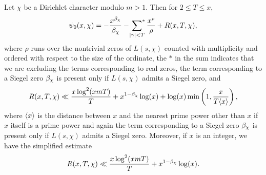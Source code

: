     \begin{corollary}\label{cor:explicit_formula_Dirichlet_corollary}
      Let $\chi$ be a Dirichlet character modulo $m > 1$. Then for $2 \le T \le x$,
      \[
        \psi_{0}(x,\chi) = -\frac{x^{\beta_{\chi}}}{\beta_{\chi}}-\sideset{}{^{\ast}}\sum_{|\gamma| < T}\frac{x^{\rho}}{\rho}+R(x,T,\chi),
      \]
      where $\rho$ runs over the nontrivial zeros of $L(s,\chi)$ counted with multiplicity and ordered with respect to the size of the ordinate, the $\ast$ in the sum indicates that we are excluding the terms corresponding to real zeros, the term corresponding to a Siegel zero $\beta_{\chi}$ is present only if $L(s,\chi)$ admits a Siegel zero, and
      \[
        R(x,T,\chi) \ll \frac{x\log^{2}(xmT)}{T}+x^{1-\beta_{\chi}}\log(x)+\log(x)\min\left(1,\frac{x}{T\langle x\rangle}\right),
      \]
      where $\langle x\rangle$ is the distance between $x$ and the nearest prime power other than $x$ if $x$ itself is a prime power and again the term corresponding to a Siegel zero $\beta_{\chi}$ is present only if $L(s,\chi)$ admits a Siegel zero. Moreover, if $x$ is an integer, we have the simplified estimate
      \[
        R(x,T,\chi) \ll \frac{x\log^{2}(xmT)}{T}+x^{1-\beta_{\chi}}\log(x).
      \]
    \end{corollary}
